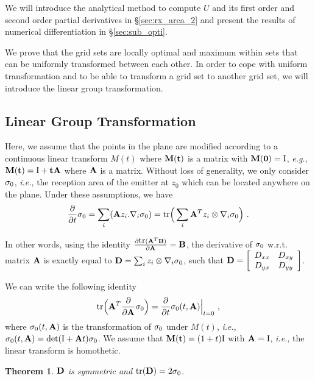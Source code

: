 \documentclass[12pt,english]{article}
\newtheorem{theorem}{Theorem}[section]
\begin{document}
We will introduce the analytical method to compute $U$ and its first order and second order partial derivatives in \S \ref{sec:rx_area_2} and present the results of numerical differentiation in \S \ref{sec:sub_opti}. 

We prove that the grid sets are locally optimal and maximum within sets that can be uniformly transformed between each other. In order to cope with uniform transformation and to be able to transform a grid set to another grid set, we will introduce the linear group transformation. 

\subsection{Linear Group Transformation}

Here, we assume that the points in the plane are modified according to a continuous linear transform $M(t)$ where $\BM{\bf (t)}$ is a matrix with \mbox{$\BM{\bf (0)}=\BI$}, {\it e.g.}, \mbox{$\BM{\bf (t)}=\BI+{\bf t}\BA$} where $\BA$ is a matrix. Without loss of generality, we only consider $\ss_0$, {\it i.e.}, the reception area of the emitter at $z_0$ which can be located anywhere on the plane. Under these assumptions, we have
$$
\frac{\partial}{\partial t}\ss_0=\sum_i (\BA z_i.\nabla_i\ss_0)=\tr\Big(\sum_{i} \BA^Tz_i\otimes \nabla_i\ss_0\Big)~.
$$

In other words, using the identity \mbox{$\frac{\partial \tr(\BA^T\BB)}{\partial \BA}=\BB$}, the derivative of $\ss_0$ w.r.t. matrix $\BA$ is exactly equal to \mbox{$\BD=\sum_{i} z_i\otimes \nabla_i\ss_0$}, 
such that
$
\BD=\left[
\begin{array}{cc}
D_{xx}&D_{xy}\\
D_{yx}&D_{yy}
\end{array}
\right]
$. 

We can write the following identity
$$
\tr\Big(\BA^T \frac{\partial}{\partial \BA}\ss_0\Big)=\frac{\partial}{\partial t}\ss_0(t,\BA)\Big|_{t=0}~,
$$
where $\ss_0(t,\BA)$ is the transformation of $\ss_0$ under $M(t)$, {\it i.e.}, \mbox{$\ss_0(t,\BA)=\det(\BI+\BA t)\ss_0$}. We assume that {$\BM{\bf (t)}=(1+t)\BI$} with \mbox{$\BA=\BI$}, {\it i.e.}, the linear transform is homothetic.


\begin{theorem}
$\BD$ is symmetric and $\tr(\BD)=2\ss_0$.
\end{theorem}
\end{document}
